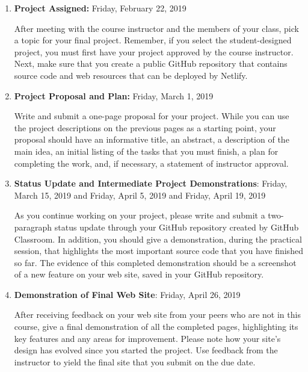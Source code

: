 \documentclass[11pt]{article}
\begin{document}
\vspace*{-.05in}

\begin{enumerate}

  \setlength{\itemsep}{0in}

  \item {\bf Project Assigned:} Friday, February 22, 2019

    After meeting with the course instructor and the members of your class, pick
    a topic for your final project. Remember, if you select the student-designed
    project, you must first have your project approved by the course instructor.
    Next, make sure that you create a public GitHub repository that contains
    source code and web resources that can be deployed by Netlify.

  \item {\bf Project Proposal and Plan:} Friday, March 1, 2019

    Write and submit a one-page proposal for your project. While you can use the
    project descriptions on the previous pages as a starting point, your
    proposal should have an informative title, an abstract, a description of the
    main idea, an initial listing of the tasks that you must finish, a plan for
    completing the work, and, if necessary, a statement of instructor approval.

  \item {\bf Status Update and Intermediate Project Demonstrations}: \newline
    Friday, March 15, 2019 and Friday, April 5, 2019 and Friday, April 19, 2019

    As you continue working on your project, please write and submit a
    two-paragraph status update through your GitHub repository created by GitHub
    Classroom. In addition, you should give a demonstration, during the
    practical session, that highlights the most important source code that you
    have finished so far.
    The evidence of this completed demonstration should be a screenshot of a new
    feature on your web site, saved in your GitHub repository.

  \item {\bf Demonstration of Final Web Site}: Friday, April 26, 2019

    After receiving feedback on your web site from your peers who are not in
    this course, give a final demonstration of all the completed pages,
    highlighting its key features and any areas for improvement. Please note how
    your site's design has evolved since you started the project. Use feedback
    from the instructor to yield the final site that you submit on the due date.


\end{enumerate}
\end{document}
